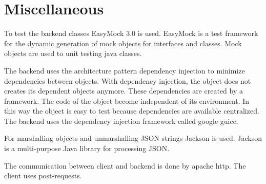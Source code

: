 \section{Miscellaneous}\label{Miscellaneous}
To test the backend classes EasyMock 3.0 is used. EasyMock is a test framework for the dynamic generation of mock objects for interfaces and classes. Mock objects are used to unit testing java classes.

The backend uses the architecture pattern dependency injection to minimize dependencies between objects. 
With dependency injection, the object does not creates its dependent objects anymore.
These dependencies are created by a framework. The code of the object become independent of its environment. In this way the object is easy to test because dependencies are available centralized.
The backend uses the dependency injection framework called google guice.

For marshalling objects and unmarshalling JSON strings Jackson is used. Jackson is a multi-purpose Java library for processing JSON.

The communication between client and backend is done by apache http. The client uses post-requests.